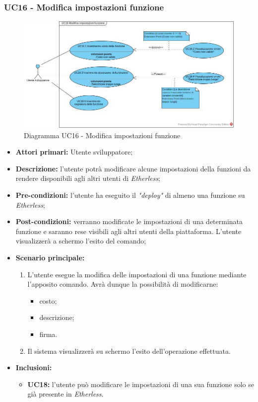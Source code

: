 \subsubsection{UC16 - Modifica impostazioni funzione}
\begin{figure}[h]
	\centering
	\includegraphics[width=\linewidth]{res/img/UC16.jpg}
	\caption{Diagramma UC16 - Modifica impostazioni funzione}
\end{figure}
\begin{itemize}
	\item \textbf{Attori primari:} Utente sviluppatore;
	\item \textbf{Descrizione:} l'utente potrà modificare alcune impostazioni della funzioni da rendere disponibili agli altri utenti di \textit{Etherless};
	\item \textbf{Pre-condizioni:} l'utente ha eseguito il \textit{"deploy\glos"} di almeno una funzione su \textit{Etherless};
	\item \textbf{Post-condizioni:} verranno modificate le impostazioni di una determinata funzione e saranno rese visibili agli altri utenti della piattaforma. L'utente visualizzerà a schermo l'esito del comando;
	\item \textbf{Scenario principale:}
	\begin{enumerate}
		\item L'utente esegue la modifica delle impostazioni di una funzione mediante l'apposito comando. Avrà dunque la possibilità di modificarne:
		\begin{itemize}
			\item costo;
			\item descrizione;
			\item firma.
		\end{itemize}
		\item Il sistema visualizzerà su schermo l'esito dell'operazione effettuata.
	\end{enumerate}
	\item \textbf{Inclusioni:}
	\begin{itemize}
		\item \textbf{UC18:} l'utente può modificare le impostazioni di una sua funzione solo se già presente in \textit{Etherless}.
	\end{itemize}
\end{itemize}
